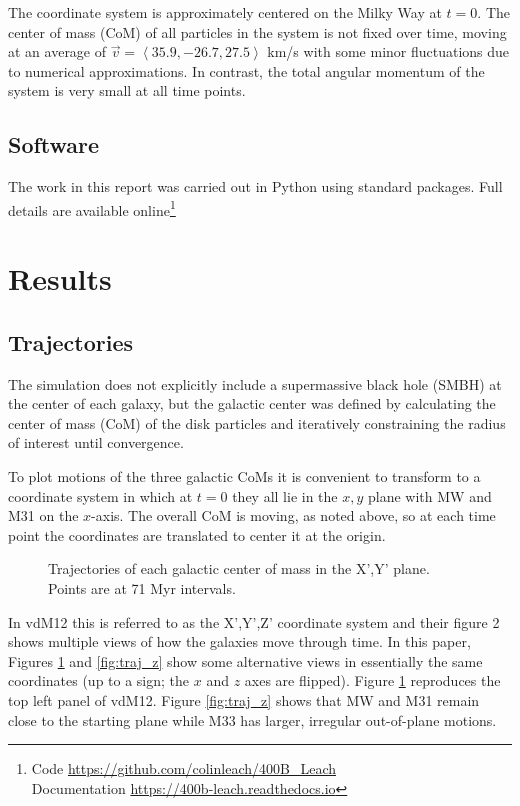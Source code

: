 \documentclass[twocolumn]{aastex63}
\begin{document}
The coordinate system is approximately centered on the Milky Way at $t=0$. The center of mass (CoM) of all particles in the system is not fixed over time, moving at an average of $\vec{v} = \left< 35.9, -26.7, 27.5 \right>$ km/s with some minor fluctuations due to numerical approximations. In contrast, the total angular momentum of the system is very small at all time points.

\subsection{Software}

The work in this report was carried out in Python using standard packages. Full details are available online\footnote{Code \url{https://github.com/colinleach/400B_Leach}\\Documentation \url{https://400b-leach.readthedocs.io}}

\section{Results}

\subsection{Trajectories}

The simulation does not explicitly include a supermassive black hole (SMBH) at the center of each galaxy, but the galactic center was defined by calculating the center of mass (CoM) of the disk particles and iteratively constraining the radius of interest until convergence.

To plot motions of the three galactic CoMs it is convenient to transform to a coordinate system in which at $t=0$ they all lie in the $x,y$ plane with MW and M31 on the $x$-axis. The overall CoM is moving, as noted above, so at each time point the coordinates are translated to center it at the origin.

\begin{figure}[htb!]
	\caption{Trajectories of each galactic center of mass in the X',Y' plane. Points are at 71 Myr intervals.
		\label{fig:traj_xy}}
\end{figure}

In vdM12 this is referred to as the X',Y',Z' coordinate system and their figure 2 shows multiple views of how the galaxies move through time. In this paper, Figures \ref{fig:traj_xy} and  \ref{fig:traj_z} show some alternative views in essentially the same coordinates (up to a sign; the $x$ and $z$ axes are flipped). Figure \ref{fig:traj_xy} reproduces the top left panel of vdM12. Figure \ref{fig:traj_z} shows that MW and M31 remain close to the starting plane while M33 has larger, irregular out-of-plane motions.
\end{document}

